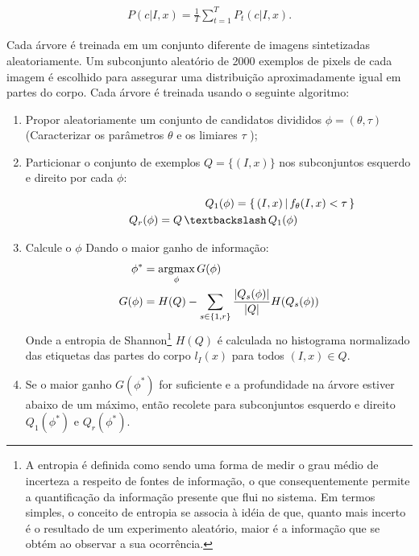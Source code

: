 \begin{align}
P(c | I, x) = \frac{1}{T} \sum_{t=1}^{T} P_{t} (c | I, x).
\label{eq:eq2}
\end{align}

Cada árvore é treinada em um conjunto diferente de imagens sintetizadas aleatoriamente. Um subconjunto aleatório de 2000 exemplos de pixels de cada imagem é escolhido para assegurar uma distribuição aproximadamente igual em partes do corpo. Cada árvore é treinada usando o seguinte algoritmo: 

\begin{enumerate}
    \item Propor aleatoriamente um conjunto de candidatos divididos $\phi = ({\theta}, \tau)$ (Caracterizar os parâmetros $\theta$ e os limiares $\tau$ );
    \item Particionar o conjunto de exemplos $Q = \{(I, x)\}$ nos subconjuntos esquerdo e direito por cada $\phi$:
    
        \begin{align}
            Q_{1}(\phi) = \{\,(I, x)\,|\, {f_{\theta}}(I, x) < \tau\,\} \\
            Q_{r}(\phi) = Q\, \textbackslash \,Q_{1}(\phi) \MoveEqLeft[5.1] 
            \label{eq:eq3_4}
        \end{align}
    \item Calcule o $\phi$ Dando o maior ganho de informação:
    \begin{align}
            \phi^* &= \operatornamewithlimits{argmax}_\phi G(\phi) \\
             G(\phi) &= H(Q) - \sum_{s\in \{1,r\}} \frac{|Q_{s}(\phi)|}{|Q|}H(Q_{s}(\phi))
            \label{eq:eq5_6}
        \end{align}
        Onde a entropia de Shannon\footnote{A entropia é definida como sendo uma forma de medir o grau médio de incerteza a respeito de fontes de informação, o que consequentemente permite a quantificação da informação presente que flui no sistema. Em termos simples, o conceito de entropia se associa à idéia de que, quanto mais incerto é o resultado de um experimento aleatório, maior é a informação que se obtém ao observar a sua ocorrência.} \cite{shannon2001mathematical}
$H(Q)$ é calculada no histograma normalizado das etiquetas das partes do corpo $l_{I}(x)$ para todos $(I,x) \in Q$.
    \item Se o maior ganho $G(\phi^{*})$ for suficiente e a profundidade na árvore estiver abaixo de um máximo, então recolete para subconjuntos esquerdo e direito $Q_{1}(\phi^{*})$ e $Q_{r}(\phi^{*})$.
\end{enumerate}

